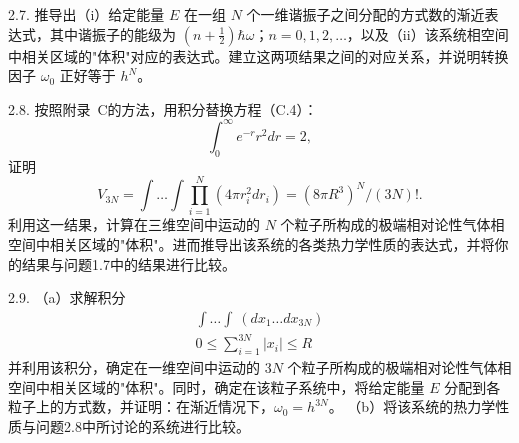 2.7. 推导出（i）给定能量 \(E\) 在一组 \(N\) 个一维谐振子之间分配的方式数的渐近表达式，其中谐振子的能级为 \(\left(n+\frac{1}{2}\right)\hbar\omega\)；\(n=0,1,2,\ldots\)，以及（ii）该系统相空间中相关区域的"体积"对应的表达式。建立这两项结果之间的对应关系，并说明转换因子 \(\omega_0\) 正好等于 \(h^N\)。

2.8. 按照附录~C的方法，用积分替换方程（C.4）：
\begin{equation}\tag{2.3.33}\label{eq:2.3.33}
\int _ { 0 } ^{\infty} e ^{- r} r ^{2} d r = 2 ,
\end{equation}
证明
\begin{equation}\tag{2.3.34}\label{eq:2.3.34}
V _ { 3 N } = \int \ldots \int \prod _ { i = 1 } ^{N} \left( 4 \pi r _ { i } ^{2} d r _ { i } \right) = ( 8 \pi R ^{3} ) ^{N} / ( 3 N ) ! .
\end{equation}
利用这一结果，计算在三维空间中运动的 \(N\) 个粒子所构成的极端相对论性气体相空间中相关区域的"体积"。进而推导出该系统的各类热力学性质的表达式，并将你的结果与问题1.7中的结果进行比较。

2.9. （a）求解积分
\begin{equation}\tag{2.3.35}\label{eq:2.3.35}
\begin{array}{r} { \int \ldots \int \ ( d x _ { 1 } \ldots d x _ { 3 N } ) } \\{ 0 \leq \sum _ { i = 1 } ^{3 N} | x _ { i } | \leq R } \end{array}
\end{equation}
并利用该积分，确定在一维空间中运动的 \(3N\) 个粒子所构成的极端相对论性气体相空间中相关区域的"体积"。同时，确定在该粒子系统中，将给定能量 \(E\) 分配到各粒子上的方式数，并证明：在渐近情况下，\(\omega_0 = h^{3N}\)。
（b）将该系统的热力学性质与问题2.8中所讨论的系统进行比较。

